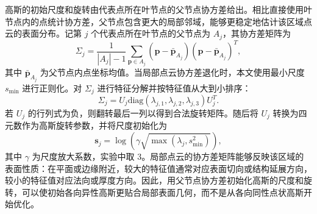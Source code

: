 {    高斯的初始尺度和旋转由代表点所在叶节点的父节点协方差给出。相比直接使用叶节点内的点统计协方差，父节点包含更大的局部邻域，能够更稳定地估计该区域点云的表面分布。记第 \(j\) 个代表点所在叶节点的父节点为 \(A_j\)，其协方差矩阵为
    \begin{equation}
        \label{equ:method-lidar-covariance}
        \Sigma_j
        =
        \frac{1}{|A_j|-1}
        \sum_{\mathbf{p}\in A_j}
        (\mathbf{p}-\bar{\mathbf{p}}_{A_j})(\mathbf{p}-\bar{\mathbf{p}}_{A_j})^{T},
    \end{equation}
    其中 \(\bar{\mathbf{p}}_{A_j}\) 为父节点内点坐标均值。当局部点云协方差退化时，本文使用最小尺度 \(s_{\min}\) 进行正则化。对 \(\Sigma_j\) 进行特征分解并按特征值从大到小排序：
    \begin{equation}
        \label{equ:method-lidar-eigen}
        \Sigma_j = U_j \mathrm{diag}(\lambda_{j,1},\lambda_{j,2},\lambda_{j,3}) U_j^{T}.
    \end{equation}
    若 \(U_j\) 的行列式为负，则翻转最后一列以得到合法旋转矩阵。随后将 \(U_j\) 转换为四元数作为高斯旋转参数，并将尺度初始化为
    \begin{equation}
        \label{equ:method-lidar-scale}
        \mathbf{s}_j
        =
        \log\left(
        \gamma
        \sqrt{
        \max(\lambda_j, s_{\min}^{2})
        }
        \right),
    \end{equation}
    其中 \(\gamma\) 为尺度放大系数，实验中取 3。局部点云的协方差矩阵能够反映该区域的表面性质：在平面或边缘附近，较大的特征值通常对应表面切向或结构延展方向，较小的特征值对应法向或厚度方向。因此，用父节点协方差初始化高斯的尺度和旋转，可以使初始各向异性高斯更贴合局部表面几何，而不是从各向同性点状高斯开始优化。
    \FloatBarrier
}
